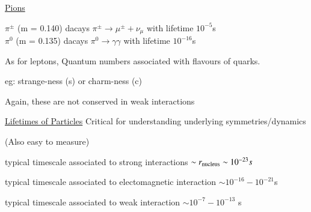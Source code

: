 {\underline{Pions}

\bc
 $\pi^\pm$ (m = 0.140) dacays  $\pi^\pm \rightarrow \mu^\pm + \nu_\mu$ with lifetime $10^{-5}$s \\ 
 $\pi^0$  (m = 0.135) dacays  $\pi^0 \rightarrow \gamma\gamma$ with lifetime $10^{-16}$s \\ 
\ec

As for leptons, Quantum numbers associated with flavours of quarks. 

eg: strange-ness (s) or charm-ness (c) 

Again, these are not conserved in weak interactions 

\underline{Lifetimes of Particles} Critical for understanding underlying symmetries/dynamics 

(Also easy to measure) 

\bi
\item[-] typical timescale associated to strong interactions $\sim r_{\textrm{nucleus}} \sim 10^{-23}s$
\item[-] typical timescale associated to electomagnetic interaction $\sim 10^{-16} - 10^{-21}$s
\item[-] typical timescale associated to weak interaction $\sim 10^{-7} - 10^{-13}$ s
\ei
}


